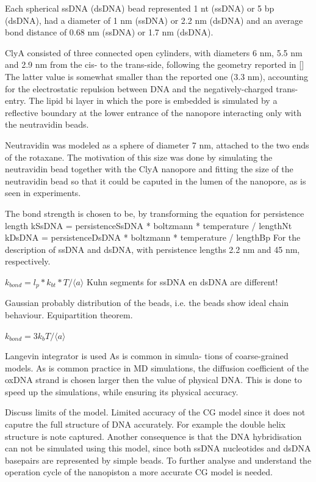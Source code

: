 Each spherical ssDNA (dsDNA) bead represented 1 nt (ssDNA) or 5 bp (dsDNA), had a
diameter of 1 nm (ssDNA) or 2.2 nm (dsDNA) and an average bond distance of 0.68 nm
(ssDNA) or 1.7 nm (dsDNA).

ClyA consisted of three connected open cylinders, with diameters 6 nm, 5.5 nm and 2.9 nm
from the cis- to the trans-side, following the geometry reported in []
The latter value is somewhat smaller than the reported one (3.3 nm), accounting for the
electrostatic repulsion between DNA and the negatively-charged trans-entry.
The lipid bi layer in which the pore is embedded is simulated by a reflective boundary at
the lower entrance of the nanopore interacting only with the neutravidin beads.

Neutravidin was modeled as a sphere of diameter 7 nm, attached to the two ends of the
rotaxane. The motivation of this size was done by simulating the neutravidin bead
together with the ClyA nanopore and fitting the size of the neutravidin bead so that it
could be caputed in the lumen of the nanopore, as is seen in experiments.


The bond strength is chosen to be, by transforming the equation for persistence length
kSsDNA = persistenceSsDNA * boltzmann * temperature / lengthNt
kDsDNA = persistenceDsDNA * boltzmann * temperature / lengthBp
For the description of ssDNA and dsDNA, with persistence lengths 2.2 nm and 45 nm,
respectively.

$k_{bond} = l_p * k_{bt} * T / \langle a \rangle$
Kuhn segments for ssDNA en dsDNA are different!

Gaussian probably distribution of the beads, i.e. the beads show ideal chain behaviour.
Equipartition theorem.

$k_{bond} = 3 k_b T / \langle a \rangle$

Langevin integrator is used As is common in simula- tions of coarse-grained models. As is
common practice in MD simulations, the diffusion coefficient of the oxDNA strand is
chosen larger then the value of physical DNA. This is done to speed up the simulations,
while ensuring its physical accuracy.

Discuss limits of the model. Limited accuracy of the CG model since it does not caputre
the full structure of DNA accurately. For example the double helix structure is note
captured. Another consequence is that the DNA hybridisation can not be simulated using
this model, since both ssDNA nucleotides and dsDNA basepairs are represented by simple
beads. To further analyse and understand the operation cycle of the nanopiston a more
accurate CG model is needed.
